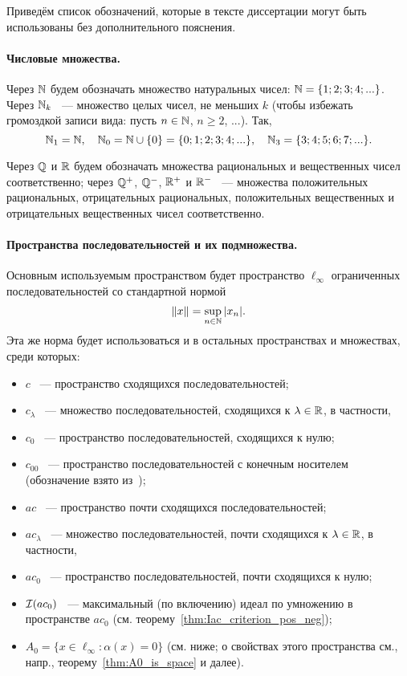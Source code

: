 Приведём список обозначений, которые в тексте диссертации могут быть использованы без дополнительного пояснения.


\paragraph{Числовые множества.}
Через $\mathbb{N}$ будем обозначать множество натуральных чисел: $\mathbb{N} = \{1;2;3;4;...\}$.
Через $\mathbb{N}_k$ ~--- множество целых чисел, не меньших $k$ (чтобы избежать громоздкой записи вида: пусть $n\in \mathbb{N}$, $n \geq 2$, ...).
Так,
\begin{equation}
	\mathbb{N}_1 = \mathbb{N}
	,
	\quad
	\mathbb{N}_0 = \mathbb{N} \cup\{0\} = \{0;1;2;3;4;...\}
	,
	\quad
	\mathbb{N}_3 = \{3;4;5;6;7;...\}
	.
\end{equation}

Через $\mathbb{Q}$ и $\mathbb{R}$ будем обозначать множества рациональных и вещественных чисел соответственно;
через $\mathbb{Q}^+$, $\mathbb{Q}^-$, $\mathbb{R}^+$ и $\mathbb{R}^-$ ~--- множества положительных рациональных, отрицательных рациональных,
положительных вещественных и отрицательных вещественных чисел соответственно.

\paragraph{Пространства последовательностей и их подмножества.}

Основным используемым пространством будет пространство $\ell_\infty$ ограниченных последовательностей со стандартной нормой
\begin{equation}
	\|x\| = \sup_{n\in\mathbb{N}} |x_n|
	.
\end{equation}
Эта же норма будет использоваться и в остальных пространствах и множествах, среди которых:
\begin{itemize}
	\item
		$c$ ~--- пространство сходящихся последовательностей;
	\item
		$c_\lambda$ ~--- множество последовательностей, сходящихся к $\lambda \in \mathbb{R}$, в частности,
	\item
		$c_0$ ~--- пространство последовательностей, сходящихся к нулю;
	\item
		$c_{00}$ ~--- пространство последовательностей с конечным носителем (обозначение взято из~\cite[теорема 4]{ASSU2});
	\item
		$ac$ ~--- пространство почти сходящихся последовательностей;
	\item
		$ac_\lambda$ ~--- множество последовательностей, почти сходящихся к $\lambda \in \mathbb{R}$, в частности,
	\item
		$ac_0$ ~--- пространство последовательностей, почти сходящихся к нулю;
	\item
		$\mathcal{I}(ac_0)$ ~--- максимальный (по включению) идеал по умножению в пространстве $ac_0$ (см. теорему~\ref{thm:Iac_criterion_pos_neg});
	\item
		$A_0 = \{ x\in\ell_\infty : \alpha(x) = 0\}$ (см. ниже; о свойствах этого пространства см., напр., теорему~\ref{thm:A0_is_space} и далее).
\end{itemize}



